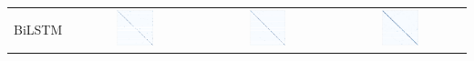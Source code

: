 \documentclass[a4paper]{article}
\begin{document}
\begin{table}[h!]
\begin{adjustbox}{max width=\textwidth}
\begin{tabular}{l|ccc}
			BiLSTM &  \includegraphics[width=0.3\textwidth]{"../assets/images/confusion matrixes/CM_BiLSTM_slot_ATIS_labeless"} & \includegraphics[width=0.3\textwidth]{"../assets/images/confusion matrixes/CM_BiLSTM_slot_remix_ATIS_labeless"} &\includegraphics[width=0.3\textwidth]{"../assets/images/confusion matrixes/CM_BiLSTM_slot_SNIPS_labeless"} \\
			\cmidrule{1-4}

\end{tabular}
\end{adjustbox}
\end{table}
\end{document}
